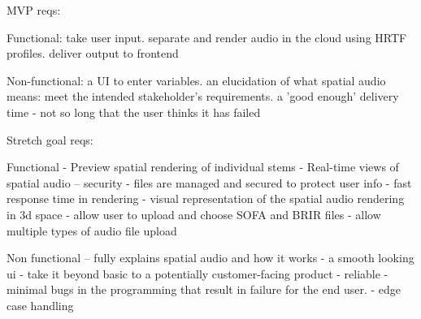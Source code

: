 MVP reqs:

Functional:
take user input.
separate and render audio in the cloud using HRTF profiles.
deliver output to frontend

Non-functional:
a UI to enter variables.
an elucidation of what spatial audio means: meet the intended stakeholder's requirements.
a 'good enough' delivery time - not so long that the user thinks it has failed

Stretch goal reqs:

Functional
- Preview spatial rendering of individual stems
- Real-time views of spatial audio
-- security - files are managed and secured to protect user info
- fast response time in rendering
- visual representation of the spatial audio rendering in 3d space
- allow user to upload and choose SOFA and BRIR files
- allow multiple types of audio file upload

Non functional
-- fully explains spatial audio and how it works
- a smooth looking ui - take it beyond basic to a potentially customer-facing product
- reliable - minimal bugs in the programming that result in failure for the end user.
- edge case handling


